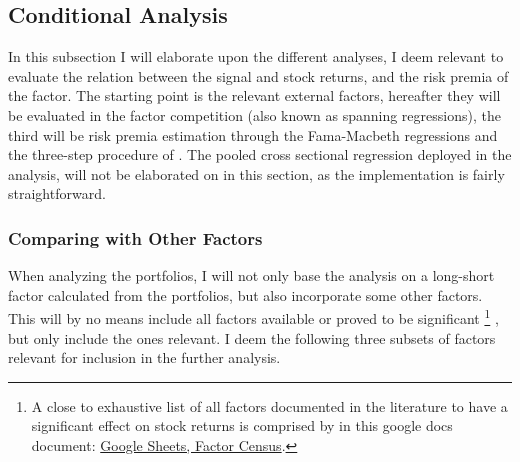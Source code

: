 \subsection{Conditional Analysis}

In this subsection I will elaborate upon the different analyses, I deem relevant to evaluate the relation between the signal and stock returns, and the risk premia of the factor. The starting point is the relevant external factors, hereafter they will be evaluated in the factor competition (also known as spanning regressions), the third will be risk premia estimation through the Fama-Macbeth regressions and the three-step procedure of \cite{giglio2021asset}. The pooled cross sectional regression deployed in the analysis, will not be elaborated on in this section, as the implementation is fairly straightforward.

\subsubsection{Comparing with Other Factors}


When analyzing the portfolios, I will not only base the analysis on a long-short factor calculated from the portfolios, but also incorporate some other factors. This will by no means include all factors available or proved to be significant
\footnote{A close to exhaustive list of all factors documented in the literature to have a significant effect on stock returns is comprised by \cite{harvey2019census} in this google docs document: \href{https://docs.google.com/spreadsheets/d/1mws1bU56ZAc8aK7Dvz696LknM0Vp4Rojc3n61q2-keY/edit?usp=sharing}{Google Sheets, Factor Census}.}
, but only include the ones relevant. I deem the following three subsets of factors relevant for inclusion in the further analysis.

